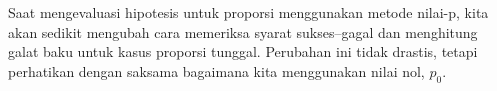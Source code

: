 
Saat mengevaluasi hipotesis untuk proporsi menggunakan
metode nilai-p,
kita akan sedikit mengubah cara memeriksa syarat sukses--gagal
dan menghitung galat baku untuk
kasus proporsi tunggal.
Perubahan ini tidak drastis, tetapi perhatikan dengan saksama
bagaimana kita menggunakan nilai nol, $p_0$.

